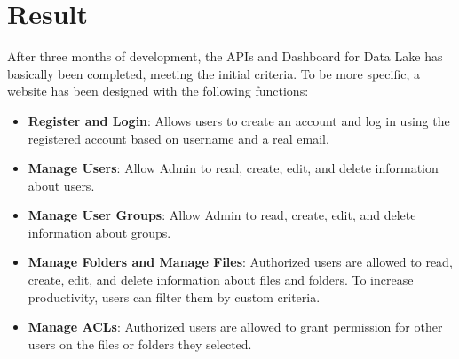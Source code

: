 \section{Result}
After three months of development, the APIs and Dashboard for Data Lake has basically been completed, meeting the initial criteria. To be more specific, a website has been designed with the following functions:
\begin{itemize}
    \item \textbf{Register and Login}: Allows users to create an account and log in using the registered account based on username and a real email.
    \item \textbf{Manage Users}: Allow Admin to read, create, edit, and delete information about users.
    \item \textbf{Manage User Groups}: Allow Admin to read, create, edit, and delete information about groups.
    \item \textbf{Manage Folders and Manage Files}: Authorized users are allowed to read, create, edit, and delete information about files and folders. To increase productivity, users can filter them by custom criteria.
    \item \textbf{Manage ACLs}: Authorized users are allowed to grant permission for other users on the files or folders they selected.
\end{itemize}

